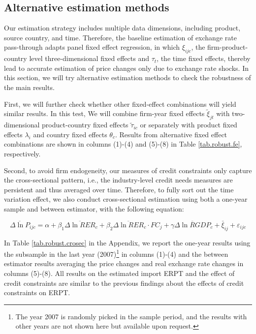 \documentclass[12pt]{article}
\begin{document}
\subsection{Alternative estimation methods}

Our estimation strategy includes multiple data dimensions, including product, source country, and time. Therefore, the baseline estimation of exchange rate pass-through adapts panel fixed effect regression, in which $\xi_{ijc}$, the firm-product-country level three-dimensional fixed effects and $\tau_t$, the time fixed effects, thereby lead to accurate estimation of price changes only due to exchange rate shocks. In this section, we will try alternative estimation methods to check the robustness of the main results.

First, we will further check whether other fixed-effect combinations will yield similar results. In this test, We will combine firm-year fixed effects $\tilde{\xi}_{jt}$ with two-dimensional product-country fixed effects $\tilde{\tau}_{ic}$ or separately with product fixed effects $\lambda_i$ and country fixed effects $\theta_{c}$.  Results from alternative fixed effect combinations are shown in columns (1)-(4) and (5)-(8) in Table \ref{tab.robust.fe}, respectively. 

Second, to avoid firm endogeneity, our measures of credit constraints only capture the cross-sectional pattern, i.e., the industry-level credit needs measures are persistent and thus averaged over time. Therefore, to fully sort out the time variation effect, we also conduct cross-sectional estimation using both a one-year sample and between estimator, with the following equation:

\begin{equation}
	\overline{\Delta \ln P}_{ijc}=\alpha+\beta_{1} \overline{\Delta \ln RER}_{c}+\beta_{2} \overline{\Delta \ln RER}_{c} \cdot FC_{j}+\gamma \overline{\Delta \ln RGDP}_{c}+\bar{\xi}_{ij} +\varepsilon_{ijc}
	\label{eq.credit.crosec}
\end{equation}

In Table \ref{tab.robust.crosec} in the Appendix, we report the one-year results using the subsample in the last year (2007)\footnote{The year 2007 is randomly picked in the sample period, and the results with other years are not shown here but available upon request.} in columns (1)-(4) and the between estimator results averaging the price changes and real exchange rate changes in columns (5)-(8). All results on the estimated import ERPT and the effect of credit constraints are similar to the previous findings about the effects of credit constraints on ERPT.
\end{document}
